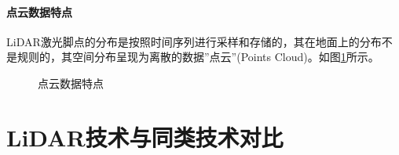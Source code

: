 \paragraph{点云数据特点}LiDAR激光脚点的分布是按照时间序列进行采样和存储的，其在地面上的分布不是规则的，其空间分布呈现为离散的数据”点云”(Points Cloud)。如图\ref{fig:点云数据特点}所示。
\begin{figure}[htbp]
	\centering
	 \quad
	\caption{点云数据特点}
	\label{fig:点云数据特点}
\end{figure}

\section{LiDAR技术与同类技术对比}
